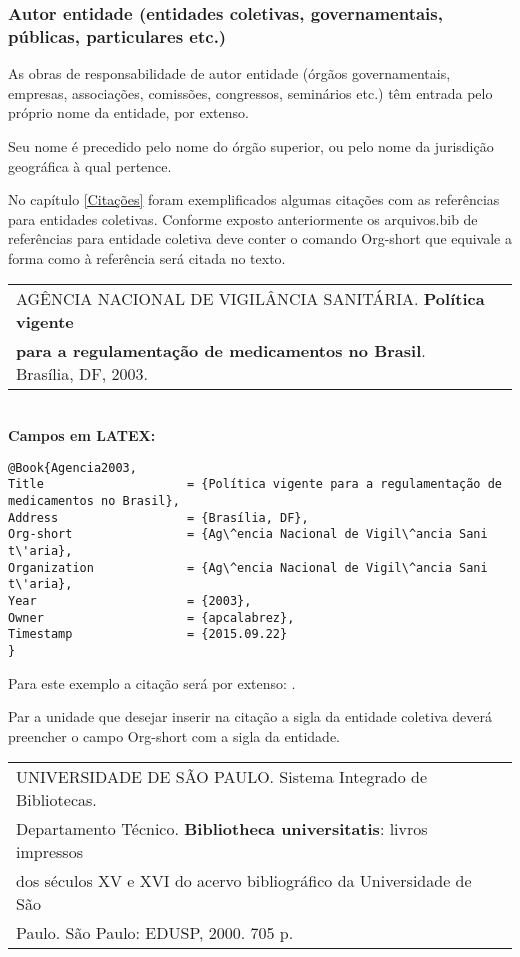 \subsubsection{Autor entidade (entidades coletivas, governamentais, públicas, particulares etc.) }

As obras de responsabilidade de autor entidade (órgãos governamentais, empresas, associações, comissões, congressos,
seminários etc.) têm entrada pelo próprio nome da entidade, por extenso.

Seu nome é precedido pelo nome do órgão superior, ou pelo nome da jurisdição geográfica à qual pertence.  

No capítulo \ref{Citações} foram exemplificados algumas citações com  as referências para entidades coletivas. Conforme exposto anteriormente os arquivos.bib de referências para entidade coletiva deve conter o comando Org-short que equivale a forma como à referência será citada no texto. \\

\begin{tabular}{|l|c|} \hline
AGÊNCIA NACIONAL DE VIGILÂNCIA SANITÁRIA. \textbf{Política vigente} \\ 
\textbf{para a regulamentação de medicamentos no Brasil}. Brasília, DF, 2003.  \\\hline
\end{tabular}\\

\textbf{Campos em LATEX:} 

\begin{verbatim}
@Book{Agencia2003,
Title                    = {Política vigente para a regulamentação de 
medicamentos no Brasil},
Address                  = {Brasília, DF},
Org-short                = {Ag\^encia Nacional de Vigil\^ancia Sani
t\'aria},
Organization             = {Ag\^encia Nacional de Vigil\^ancia Sani
t\'aria},
Year                     = {2003},
Owner                    = {apcalabrez},
Timestamp                = {2015.09.22}
}
\end{verbatim}

Para este exemplo a citação será por extenso: \cite{Agencia2003}. 

Par a unidade que desejar inserir na citação a sigla da entidade coletiva deverá preencher o campo Org-short com a sigla da entidade. \\

\begin{tabular}{|l|c|} \hline
	UNIVERSIDADE DE SÃO PAULO. Sistema Integrado de Bibliotecas. \\Departamento Técnico.  \textbf{Bibliotheca universitatis}: livros impressos \\dos séculos XV e XVI do acervo bibliográfico da Universidade de São \\Paulo. São Paulo: EDUSP, 2000. 705 p.   \\\hline
\end{tabular}\\

